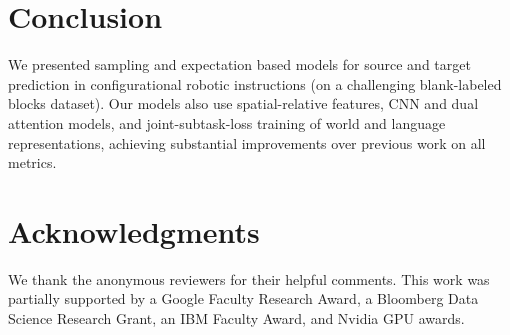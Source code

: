 \documentclass[letterpaper]{article} %
\begin{document}
\section{Conclusion}
We presented sampling and expectation based models for source and target prediction in configurational robotic instructions (on a challenging blank-labeled blocks dataset). Our models also use spatial-relative features, CNN and dual attention models, and joint-subtask-loss training of world and language representations, achieving substantial improvements over previous work on all metrics.

\section*{Acknowledgments}
We thank the anonymous reviewers for their helpful
comments. This work was partially supported by a
Google Faculty Research Award, a Bloomberg Data Science Research Grant, an IBM Faculty
Award, and Nvidia GPU awards.



\end{document}
